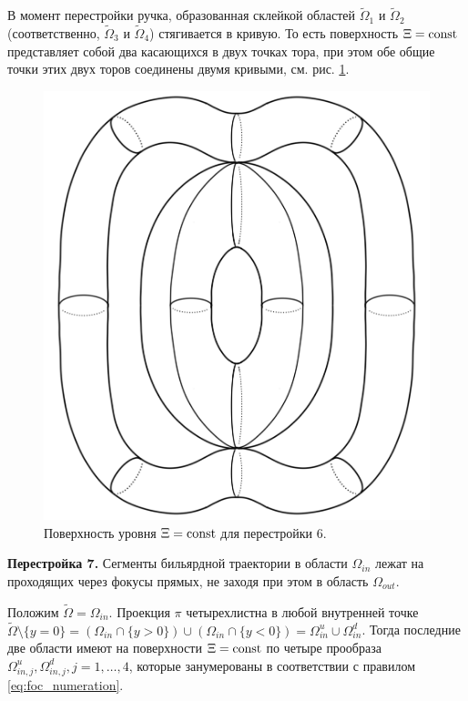 В момент перестройки ручка, образованная склейкой областей $\widetilde{\Omega}_1$ и $\widetilde{\Omega}_2$ (соответственно, $\widetilde{\Omega}_3$ и $\widetilde{\Omega}_4$) стягивается в кривую. 
То есть поверхность $\Xi = \mathrm{const}$ представляет собой два касающихся в двух точках тора, при этом обе общие точки этих двух торов соединены двумя кривыми, см. рис. \ref{fig:pt9:_atom_6}.
\begin{figure}[!htb]
\centering
\includegraphics[scale=0.09]{images/ch4/section2/atoms/atom_6.pdf}
    \caption{Поверхность уровня $\Xi = \mathrm{const}$ для перестройки 6.}
    \label{fig:pt9:_atom_6}
\end{figure}


\textbf{Перестройка 7.}
Сегменты бильярдной траектории в области $\Omega_{in}$ лежат на проходящих через фокусы прямых, не заходя при этом в область $\Omega_{out}$.

Положим $\widetilde{\Omega} = \Omega_{in}$. Проекция $\pi$ четырехлистна в любой внутренней точке $\widetilde{\Omega} \setminus \{y=0\}  = (\Omega_{in} \cap \{y>0\}) \cup (\Omega_{in} \cap \{y<0\}) = \Omega_{in}^u \cup \Omega_{in}^d$.
Тогда последние две области имеют на поверхности $\Xi = \mathrm{const}$ по четыре прообраза $\Omega_{in, j}^u, \Omega_{in, j}^d, j=1, \ldots, 4$, которые занумерованы в соответствии с правилом \eqref{eq:foc_numeration}.

